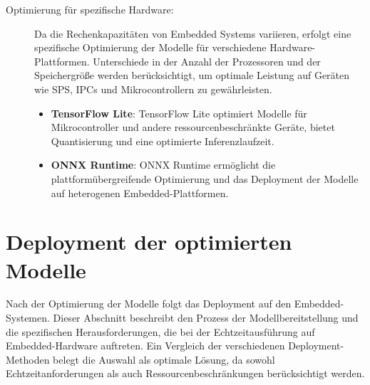 \begin{description}
    \item[Optimierung für spezifische Hardware:] Da die Rechenkapazitäten von Embedded Systems variieren, erfolgt eine spezifische Optimierung der Modelle 
    für verschiedene Hardware-Plattformen. Unterschiede in der Anzahl der Prozessoren und der Speichergröße werden berücksichtigt, um optimale Leistung auf 
    Geräten wie SPS, IPCs und Mikrocontrollern zu gewährleisten.
    \begin{itemize}
        \item \textbf{TensorFlow Lite}: TensorFlow Lite optimiert Modelle für Mikrocontroller und andere ressourcenbeschränkte Geräte, 
        bietet Quantisierung und eine optimierte Inferenzlaufzeit.
        \item \textbf{ONNX Runtime}: ONNX Runtime ermöglicht die plattformübergreifende Optimierung und das Deployment der Modelle auf heterogenen Embedded-Plattformen.
    \end{itemize}
\end{description}

\section{Deployment der optimierten Modelle}

Nach der Optimierung der Modelle folgt das Deployment auf den Embedded-Systemen. Dieser Abschnitt beschreibt den Prozess der Modellbereitstellung 
und die spezifischen Herausforderungen, die bei der Echtzeitausführung auf Embedded-Hardware auftreten. Ein Vergleich der verschiedenen 
Deployment-Methoden belegt die Auswahl als optimale Lösung, da sowohl Echtzeitanforderungen als auch Ressourcenbeschränkungen berücksichtigt werden.

